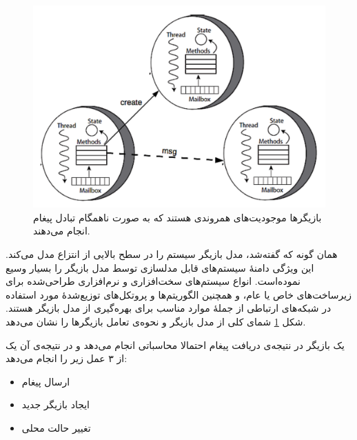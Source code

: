 \begin{figure}
    \begin{center}
	\includegraphics[width=12cm]{2-Preliminaries/Figures/Actor_Structure.pdf}
    \end{center}
    \caption{\label{fig:actorStructure} بازیگر‌ها موجودیت‌های همروندی هستند که به صورت ناهمگام تبادل پیغام انجام ‌می‌دهند. }
\end{figure}


همان گونه که گفته‌شد، مدل بازیگر سیستم را در سطح بالایی از انتزاع مدل می‌کند.
این ویژگی دامنهٔ سیستم‌های قابل مدلسازی توسط مدل بازیگر را بسیار وسیع نموده‌است.
انواع سیستم‌های سخت‌افزاری و نرم‌افزاری طراحی‌شده برای زیرساخت‌های خاص یا عام، و همچنین الگوریتم‌ها و پروتکل‌های توزیع‌شدهٔ مورد استفاده در شبکه‌های ارتباطی از جملهٔ موارد مناسب برای بهره‌گیری از مدل بازیگر هستند. شکل \ref{fig:actorStructure} شمای کلی از مدل بازیگر و نحوه‌ی تعامل بازیگر‌ها را نشان می‌دهد.
 
 یک بازیگر در نتیجه‌ی دریافت پیغام احتمالا محاسباتی انجام می‌دهد و در نتیجه‌ی آن یک از ۳ عمل زیر را انجام می‌دهد:
\begin{itemize}
\item ارسال پیغام
\item ایجاد بازیگر جدید
\item تغییر حالت محلی
\end{itemize} 

